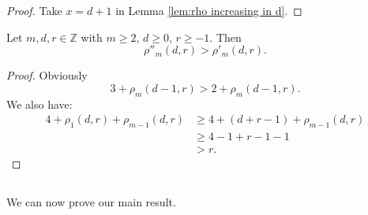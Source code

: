 \documentclass{amsart}
\numberwithin{equation}{section}
\begin{document}
\begin{proof}
   Take $x=d+1$ in Lemma \ref{lem:rho increasing in d}.
\end{proof}


\begin{lemma} \label{lem:compare rho' rho''}
   Let $m,d,r\in \mathbb{Z}$ with $m\geqslant 2$, $d\geqslant 0$, $r\geqslant -1$. Then 
   \[    \rho''_m(d,r) > \rho'_m(d,r).   \]
\end{lemma}

\begin{proof}
   Obviously 
   \[ 3+ \rho_m(d-1, r) > 2+ \rho_m(d-1, r). \]
   We also have:
\begin{align*}
   4+ \rho_1(d,r) + \rho_{m-1}(d,r) &\geqslant 4 + (d+r-1) + \rho_{m-1}(d,r) \\
   &\geqslant 4 -1 +r-1 -1 \\
   & > r.
\end{align*}
\end{proof}


\subsection{}

We can now prove our main result.
\end{document}
